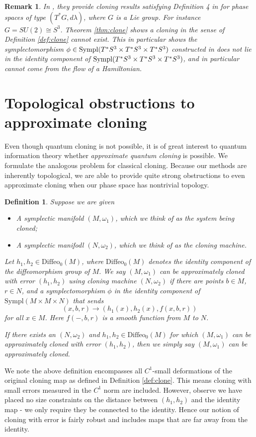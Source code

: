\documentclass[jmp,amsmath,amssymb]{revtex4-1}
\theoremstyle{plain}
\newtheorem{remark}[theorem]{Remark}
\newtheorem{definition}[theorem]{Definition}
\begin{document}
\begin{remark} \label{remark:comparison}
    In \cite{REDDY2019125846}, they provide cloning results satisfying Definition 4 in \cite{fenyes} for phase spaces of type $(T^*G,d\lambda)$, where $G$ is a Lie group. For instance $G = SU(2) \cong S^3$. Theorem \ref{thm:clone} shows a cloning in the sense of Definition \ref{def:clone} cannot exist. This in particular shows the symplectomorphism $\phi \in \textup{Sympl}(T^*S^3 \times T^*S^3 \times T^*S^3)$ constructed in \cite{REDDY2019125846} does not lie in the identity component of $\textup{Sympl}(T^*S^3 \times T^*S^3 \times T^*S^3)$, and in particular cannot come from the flow of a Hamiltonian.
\end{remark}

\section{Topological obstructions to approximate cloning}

Even though quantum cloning is not possible, it is of great interest to quantum information theory whether \emph{approximate quantum cloning} is possible. We formulate the analogous problem for classical cloning. Because our methods are inherently topological, we are able to provide quite strong obstructions to even approximate cloning when our phase space has nontrivial topology.

\begin{definition} \label{def:approximate cloning}
    Suppose we are given
    \begin{itemize}
    \item A symplectic manifold $(M,\omega_1)$, which we think of as the system being cloned;
    \item A symplectic manifodl $(N,\omega_2)$, which we think of as the cloning machine.
    \end{itemize}
    Let $h_1, h_2 \in \mathrm{Diffeo}_0(M)$, where $\mathrm{Diffeo}_0(M)$ denotes the identity component of the diffeomorphism group of $M$. We say $(M,\omega_1)$ can be approximately cloned with error $(h_1,h_2)$ using cloning machine $(N,\omega_2)$ if there are points $b\in M$, $r\in N$, and a symplectomorphism $\phi$ in the identity component of $\mathrm{Sympl}(M\times M \times N)$ that sends
    \[
    (x,b,r) \rightarrow (h_1(x),h_2(x),f(x,b,r))
    \]
    for all $x\in M$. Here $f(-,b,r)$ is a smooth function from $M$ to $N$.

    If there exists an $(N, \omega_2)$ and $h_1,h_2 \in \mathrm{Diffeo}_0(M)$ for which $(M,\omega_1)$ can be approximately cloned with error $(h_1,h_2)$, then we simply say $(M,\omega_1)$ can be approximately cloned.
\end{definition}
We note the above definition encompasses all $C^1$-small deformations of the original cloning map as defined in Definition \ref{def:clone}. This means cloning with small errors measured in the $C^1$ norm are included. However,
observe we have placed no size constraints on the distance between $(h_1,h_2)$ and the identity map - we only require they be connected to the identity. Hence our notion of cloning with error is fairly robust and includes maps that are far away from the identity.
\end{document}
